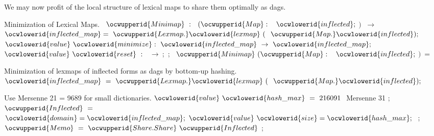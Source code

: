 \documentclass[12pt]{article}
\begin{document}
We may now profit of the local structure of lexical maps to share them
optimally as dags.

\label{../ML/minimap.mli:0}%
Minimization of Lexical Maps. 
\ocweol
\label{../ML/minimap.mli:654}%
\medskip
\ocwbegincode{}\ocwindent{0.00em}
~$\ocwupperid{Minimap}~:~$~$(\ocwupperid{Map}:$~~$\ocwlowerid{inflected};~$$)~$\ocweol
\ocwindent{0.00em}
$\rightarrow{}~$~~$\ocwlowerid{inflected\_map}=~\ocwupperid{Lexmap.}\ocwlowerid{lexmap}~($~$\ocwupperid{Map.}\ocwlowerid{inflected});$\ocweol
\ocwindent{3.50em}
$\ocwlowerid{value}~\ocwlowerid{minimize}:~\ocwlowerid{inflected\_map}~\rightarrow{}~\ocwlowerid{inflected\_map};~$\ocweol
\ocwindent{3.50em}
$\ocwlowerid{value}~\ocwlowerid{reset}~:~$~$\rightarrow{}~$;~;\ocweol
\ocwendcode{}
\label{../ML/minimap.ml:0}%
\label{../ML/minimap.ml:655}%
\ocwbegincode{}\ocwindent{0.00em}
~$\ocwupperid{Minimap}~(\ocwupperid{Map}:$~~$\ocwlowerid{inflected};~$$)~=~$\medskip

\ocwendcode{}\ocwindent{0.00em}
Minimization of lexmaps of inflected forms as dags by bottom-up hashing. 
\ocweol
\label{../ML/minimap.ml:919}%
\medskip
\ocwbegincode{}\ocwindent{0.00em}
~$\ocwlowerid{inflected\_map}~=~\ocwupperid{Lexmap.}\ocwlowerid{lexmap}~($~$\ocwupperid{Map.}\ocwlowerid{inflected});$\medskip

\ocwendcode{}\ocwindent{0.00em}
Use Mersenne 21 = 9689 for small dictionaries. 
\ocweol
\label{../ML/minimap.ml:1033}%
\medskip
\ocwbegincode{}\ocwindent{0.00em}
$\ocwlowerid{value}~\ocwlowerid{hash\_max}~=~216091~$\ocwbc{} Mersenne 31 \ocwec{}\ocweol
\ocwindent{0.00em}
;\ocweol
\ocwindent{0.00em}
~$\ocwupperid{Inflected}~=~$~~$\ocwlowerid{domain}=\ocwlowerid{inflected\_map};~\ocwlowerid{value}~\ocwlowerid{size}=\ocwlowerid{hash\_max};~$\ocweol
\ocwindent{0.00em}
;\ocweol
\ocwindent{0.00em}
~$\ocwupperid{Memo}~=~\ocwupperid{Share.Share}~\ocwupperid{Inflected}$\ocweol
\ocwindent{0.00em}
;\medskip
\end{document}
